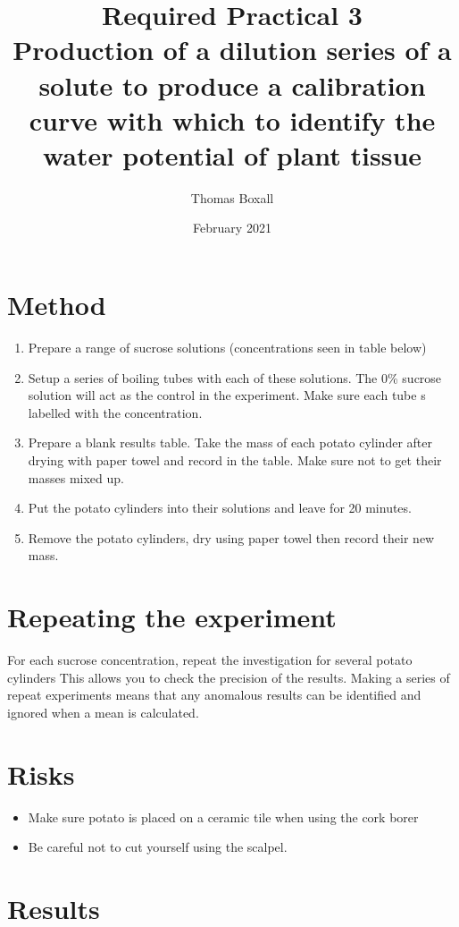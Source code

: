 \documentclass{thomasClass}
\title{\textbf{Required Practical 3}
\\Production of a dilution series of a solute to produce a calibration curve with which to identify the water potential of plant tissue
}
\author{Thomas Boxall}
\date{February 2021}
\begin{document}
\maketitle

\section{Method}
\begin{enumerate}
    \item Prepare a range of sucrose solutions (concentrations seen in table below)
    \item Setup a series of boiling tubes with each of these solutions. The 0\% sucrose solution will act as the control in the experiment. Make sure each tube s labelled with the concentration.
    \item Prepare a blank results table. Take the mass of each potato cylinder after drying with paper towel and record in the table. Make sure not to get their masses mixed up.
    \item Put the potato cylinders into their solutions and leave for 20 minutes.
    \item Remove the potato cylinders, dry using paper towel then record their new mass.
\end{enumerate}
 \section{Repeating the experiment}
 For each sucrose concentration, repeat the investigation for several potato cylinders This allows you to check the precision of the results. Making a series of repeat experiments means that any anomalous results can be identified and ignored when a mean is calculated.
\section{Risks}
\begin{itemize}
    \item Make sure potato is placed on a ceramic tile when using the cork borer
    \item Be careful not to cut yourself using the scalpel.
\end{itemize}

\section{Results}
\end{document}
